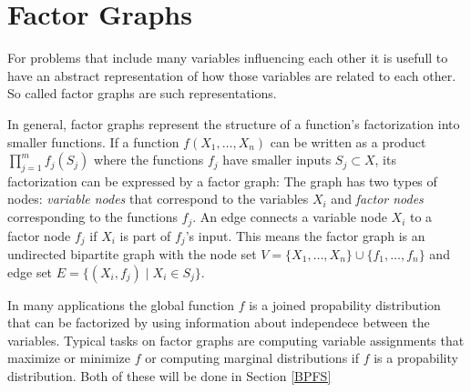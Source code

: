 \section{Factor Graphs}

For problems that include many variables influencing each other it is usefull to have an abstract representation of how those	 variables are related to each other. So called factor graphs are such representations.\newline

In general, factor graphs represent the structure of a function's factorization into smaller functions. \newline If a function $f(X_1, \ldots, X_n)$ can be written as a product $\prod_{j=1}^{m}{f_j(S_j)}$  where the functions $f_j$ have smaller inputs $S_j \subset X$, its factorization 
can be expressed by a factor graph: The graph has two types of nodes: 
\emph{variable nodes} that correspond to the variables $X_i$ and \emph{factor nodes} corresponding to the functions $f_j$. An edge connects a variable node $X_i$ to a factor node $f_j$ if $X_i$ is part of $f_j$'s input. 
This means the factor graph is an undirected bipartite graph with the node set $ V = \{X_1, \ldots, X_n\} \cup \{f_1, \ldots, f_n\}$ and edge set $E = \{(X_i, f_j) \; | \; X_i \in S_j\}$. 

In many applications the global function $f$ is a joined propability distribution that can be factorized by using information about independece between the variables. Typical tasks on factor graphs are computing variable assignments that maximize or minimize $f$ or computing marginal distributions if $f$ is a propability distribution. Both of these will be done in Section \ref{BPFS}\newline

